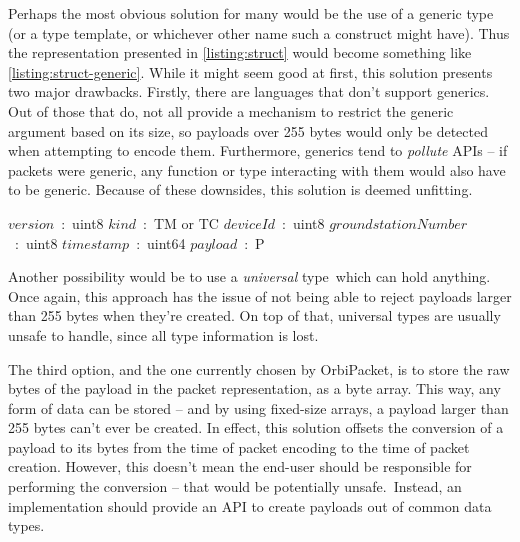 \documentclass[a4paper,11pt,english]{article}
\def\t#1:#2;{\ensuremath{\textit{#1}}\ :\ #2}
\def\T{\State\t}
\begin{document}
Perhaps the most obvious solution for many would be the use of a generic type (or a type template, or whichever other name such a construct might have). Thus the representation presented in \cref{listing:struct} would become something like \cref{listing:struct-generic}. While it might seem good at first, this solution presents two major drawbacks. Firstly, there are languages that don't support generics. Out of those that do, not all provide a mechanism to restrict the generic argument based on its size, so payloads over 255 bytes would only be detected when attempting to encode them. Furthermore, generics tend to \textit{pollute} APIs -- if packets were generic, any function or type interacting with them would also have to be generic. Because of these downsides, this solution is deemed unfitting.

\begin{algorithm}[h]
  \caption{A generic packet}\label{listing:struct-generic}
  \begin{algorithmic}[1]
    \T version:uint8;
    \T kind:TM or TC;
    \T deviceId:uint8;
    \T groundstationNumber:uint8;
    \T timestamp:uint64;
    \T payload:P;
    \EndStruct
  \end{algorithmic}
\end{algorithm}

Another possibility would be to use a \textit{universal} type\footnotemark\ which can hold anything. Once again, this approach has the issue of not being able to reject payloads larger than 255 bytes when they're created. On top of that, universal types are usually unsafe to handle, since all type information is lost.


The third option, and the one currently chosen by OrbiPacket, is to store the raw bytes of the payload in the packet representation, as a byte array. This way, any form of data can be stored -- and by using fixed-size arrays, a payload larger than 255 bytes can't ever be created. In effect, this solution offsets the conversion of a payload to its bytes from the time of packet encoding to the time of packet creation. However, this doesn't mean the end-user should be responsible for performing the conversion -- that would be potentially unsafe.\footnotemark\ Instead, an implementation should provide an API to create payloads out of common data types.
\end{document}
